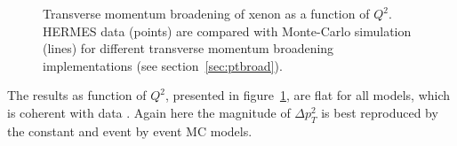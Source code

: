 \begin{figure}[tbp]
  \centering
{}
\caption {Transverse momentum broadening of xenon as a function of $Q^2$. 
HERMES data \cite{Airapetian:2009jy} (points) are compared with Monte-Carlo 
simulation (lines) for different transverse momentum broadening implementations 
(see section~\ref{sec:ptbroad}).}
\label{fig:PtC-PtQ2}
\end{figure}

The results as function of $Q^2$, presented in figure~\ref{fig:PtC-PtQ2}, are 
flat for all models, which is coherent with data \cite{Airapetian:2009jy}. 
Again here the magnitude of $\Delta p_T^2$ is best reproduced by the constant 
and event by event MC models.


